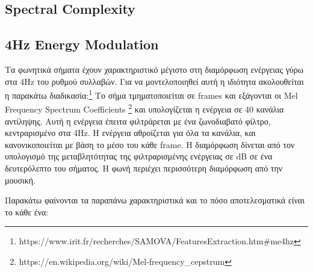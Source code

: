 \subsection{Spectral Complexity}




\subsection{4Hz Energy Modulation}

Τα φωνητικά σήματα έχουν χαρακτηριστικό μέγιστο στη διαμόρφωση ενέργειας γύρω στα 4Hz του ρυθμού συλλαβών. Για να μοντελοποιηθεί αυτή η ιδιότητα ακολουθείται η παρακάτω διαδικασία:\footnote{https://www.irit.fr/recherches/SAMOVA/FeaturesExtraction.htm\#me4hz} Το σήμα τμηματοποιείται σε frames και εξάγονται οι Mel Frequency Spectrum Coefficients \footnote{https://en.wikipedia.org/wiki/Mel-frequency\_cepstrum} και υπολογίζεται η ενέργεια σε 40 κανάλια αντίληψης. Αυτή η ενέργεια έπειτα φιλτράρεται με ένα ζωνοδιαβατό φίλτρο, κεντραρισμένο στα 4Hz. Η ενέργεια αθροίζεται για όλα τα κανάλια, και κανονικοποιείται με βάση το μέσο του κάθε frame. Η διαμόρφωση δίνεται από τον υπολογισμό της μεταβλητότητας της φιλτραρισμένης ενέργειας σε dB σε ένα δευτερόλεπτο του σήματος. Η φωνή περιέχει περισσότερη διαμόρφωση από την μουσική.


Παρακάτω φαίνονται τα παραπάνω χαρακτηριστικά και το πόσο αποτελεσματικά είναι το κάθε ένα:



